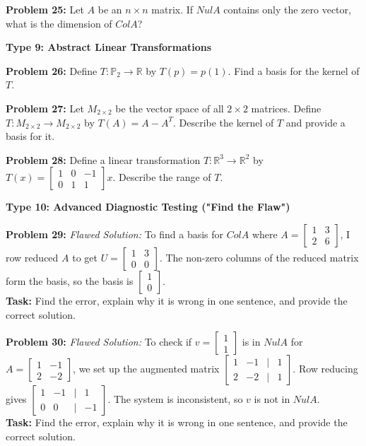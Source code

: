 \documentclass[11pt]{article}
\begin{document}
\noindent \textbf{Problem 25:} Let $A$ be an $n \times n$ matrix. If $Nul A$ contains only the zero vector, what is the dimension of $Col A$?

\vspace{0.5cm}
\noindent \textbf{Type 9: Abstract Linear Transformations}

\noindent \textbf{Problem 26:} Define $T: \mathbb{P}_2 \to \mathbb{R}$ by $T(p) = p(1)$. Find a basis for the kernel of $T$.

\noindent \textbf{Problem 27:} Let $M_{2 \times 2}$ be the vector space of all $2 \times 2$ matrices. Define $T: M_{2 \times 2} \to M_{2 \times 2}$ by $T(A) = A - A^T$. Describe the kernel of $T$ and provide a basis for it.

\noindent \textbf{Problem 28:} Define a linear transformation $T: \mathbb{R}^3 \to \mathbb{R}^2$ by $T(x) = \begin{bmatrix} 1 & 0 & -1 \\ 0 & 1 & 1 \end{bmatrix} x$. Describe the range of $T$.

\vspace{0.5cm}
\noindent \textbf{Type 10: Advanced Diagnostic Testing ("Find the Flaw")}

\noindent \textbf{Problem 29:} \textit{Flawed Solution:} To find a basis for $Col A$ where $A = \begin{bmatrix} 1 & 3 \\ 2 & 6 \end{bmatrix}$, I row reduced $A$ to get $U = \begin{bmatrix} 1 & 3 \\ 0 & 0 \end{bmatrix}$. The non-zero columns of the reduced matrix form the basis, so the basis is $\begin{bmatrix} 1 \\ 0 \end{bmatrix}$. \\
\textbf{Task:} Find the error, explain why it is wrong in one sentence, and provide the correct solution.

\noindent \textbf{Problem 30:} \textit{Flawed Solution:} To check if $v = \begin{bmatrix} 1 \\ 1 \end{bmatrix}$ is in $Nul A$ for $A = \begin{bmatrix} 1 & -1 \\ 2 & -2 \end{bmatrix}$, we set up the augmented matrix $\begin{bmatrix} 1 & -1 & | & 1 \\ 2 & -2 & | & 1 \end{bmatrix}$. Row reducing gives $\begin{bmatrix} 1 & -1 & | & 1 \\ 0 & 0 & | & -1 \end{bmatrix}$. The system is inconsistent, so $v$ is not in $Nul A$. \\
\textbf{Task:} Find the error, explain why it is wrong in one sentence, and provide the correct solution.
\end{document}
